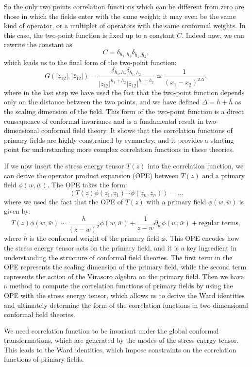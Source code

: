 So the only two points correlation functions which can be different from zero are those in which the fields enter with the same weight; it may even be the same kind of operator, or a multiplet of operators with the same conformal weights. In this case, the two-point function is fixed up to a constant $C$. Indeed now, we can rewrite the constant as
\[
    C = \delta_{h_1, h_2} \delta_{\bar{h}_1, \bar{h}_2},
\]
which leads us to the final form of the two-point function:
\[
    G(\vert z_{12} \vert, \vert \bar{z}_{12} \vert) = \frac{\delta_{h_1, h_2} \delta_{\bar{h}_1, \bar{h}_2}}{\vert z_{12} \vert^{h_1 + h_2} \vert \bar{z}_{12} \vert^{\bar{h}_1 + \bar{h}_2}} \simeq \frac{1}{(x_1-x_2)^{2\Delta}},
\]
where in the last step we have used the fact that the two-point function depends only on the distance between the two points, and we have defined $\Delta = h + \bar{h}$ as the scaling dimension of the field. This form of the two-point function is a direct consequence of conformal invariance and is a fundamental result in two-dimensional conformal field theory. It shows that the correlation functions of primary fields are highly constrained by symmetry, and it provides a starting point for understanding more complex correlation functions in these theories.

If we now insert the stress energy tensor $T(z)$ into the correlation function, we can derive the operator product expansion (OPE) between $T(z)$ and a primary field $\phi(w,\bar{w})$. The OPE takes the form:
\[
    \left\langle T(z) \phi(z_1,\bar{z}_1) \cdots \phi(z_n,\bar{z}_n) \right\rangle =\dots
\]
where we used the fact that the OPE of $T(z)$ with a primary field $\phi(w,\bar{w})$ is given by:
\[
    T(z) \phi(w,\bar{w}) \sim \frac{h}{(z-w)^2} \phi(w,\bar{w}) + \frac{1}{z-w} \partial_w \phi(w,\bar{w}) + \text{regular terms},
\]
where $h$ is the conformal weight of the primary field $\phi$. This OPE encodes how the stress energy tensor acts on the primary field, and it is a key ingredient in understanding the structure of conformal field theories. The first term in the OPE represents the scaling dimension of the primary field, while the second term represents the action of the Virasoro algebra on the primary field. Then we have a method to compute the correlation functions of primary fields by using the OPE with the stress energy tensor, which allows us to derive the Ward identities and ultimately determine the form of the correlation functions in two-dimensional conformal field theories.

We need correlation function to be invariant under the global conformal transformations, which are generated by the modes of the stress energy tensor. This leads to the Ward identities, which impose constraints on the correlation functions of primary fields.

